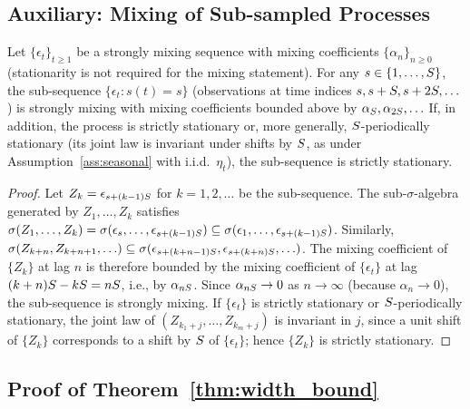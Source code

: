 \subsection{Auxiliary: Mixing of Sub-sampled Processes}
\label{app:proofs:submixing}

\begin{proposition}
\label{prop:submixing}
Let $\{\epsilon_t\}_{t \geq 1}$ be a strongly
mixing sequence with mixing coefficients $\{\alpha_n\}_{n \geq 0}$
(stationarity is not required for the mixing statement).
For any $s \in \{1,\ldots,S\}$, the sub-sequence
$\{\epsilon_t : s(t) = s\}$ (observations at time indices
$s, s+S, s+2S, \ldots$) is strongly
mixing with mixing coefficients bounded above by
$\alpha_S, \alpha_{2S}, \ldots$
If, in addition, the process is strictly stationary or, more
generally, $S$-periodically stationary (its joint law is
invariant under shifts by $S$, as under
Assumption~\ref{ass:seasonal} with i.i.d.\ $\eta_t$), the
sub-sequence is strictly stationary.
\end{proposition}

\begin{proof}
Let $Z_k = \epsilon_{s + (k-1)S}$ for $k = 1, 2, \ldots$ be
the sub-sequence.  The sub-$\sigma$-algebra generated by
$Z_1, \ldots, Z_k$ satisfies
$\sigma(Z_1, \ldots, Z_k) = \sigma(\epsilon_s, \ldots, \epsilon_{s+(k-1)S})
\subseteq \sigma(\epsilon_1, \ldots, \epsilon_{s+(k-1)S})$.
Similarly, $\sigma(Z_{k+n}, Z_{k+n+1}, \ldots) \subseteq
\sigma(\epsilon_{s+(k+n-1)S}, \epsilon_{s+(k+n)S}, \ldots)$.
The mixing coefficient of $\{Z_k\}$ at lag $n$ is therefore
bounded by the mixing coefficient of $\{\epsilon_t\}$ at lag
$(k+n)S - kS = nS$, i.e., by $\alpha_{nS}$.
Since $\alpha_{nS} \to 0$ as $n \to \infty$ (because
$\alpha_n \to 0$), the sub-sequence
is strongly mixing.  If $\{\epsilon_t\}$ is strictly stationary
or $S$-periodically stationary, the joint law of
$(Z_{k_1+j}, \ldots, Z_{k_m+j})$ is invariant in $j$, since a
unit shift of $\{Z_k\}$ corresponds to a shift by $S$ of
$\{\epsilon_t\}$; hence $\{Z_k\}$ is strictly stationary.
\end{proof}

\subsection{Proof of Theorem~\ref{thm:width_bound}}
\label{app:proofs:thm2s}

